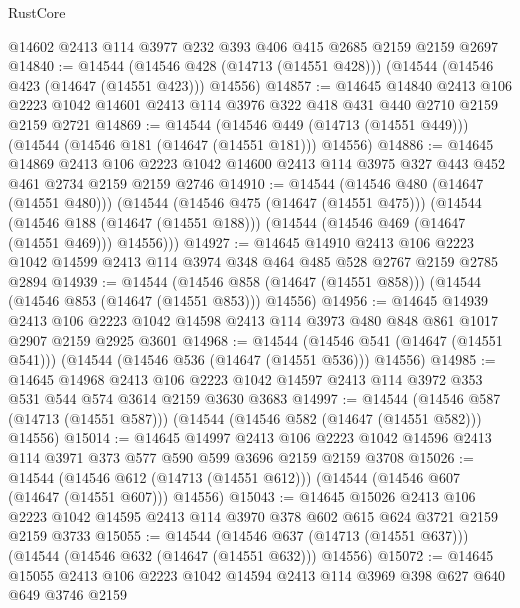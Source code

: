 \begin{lexlean}{RustCore}
\begin{coremodule}
    @14602
    @2413
    @114
    @3977
    @232
    @393
    @406
    @415
    @2685
    @2159
    @2159
    @2697
@14840 := @14544
    (@14546 @428 (@14713 (@14551 @428)))
    (@14544 (@14546 @423 (@14647 (@14551 @423))) @14556)
@14857 := @14645
    @14840
    @2413
    @106
    @2223
    @1042
    @14601
    @2413
    @114
    @3976
    @322
    @418
    @431
    @440
    @2710
    @2159
    @2159
    @2721
@14869 := @14544
    (@14546 @449 (@14713 (@14551 @449)))
    (@14544 (@14546 @181 (@14647 (@14551 @181))) @14556)
@14886 := @14645
    @14869
    @2413
    @106
    @2223
    @1042
    @14600
    @2413
    @114
    @3975
    @327
    @443
    @452
    @461
    @2734
    @2159
    @2159
    @2746
@14910 := @14544
    (@14546 @480 (@14647 (@14551 @480)))
    (@14544
      (@14546 @475 (@14647 (@14551 @475)))
      (@14544
        (@14546 @188 (@14647 (@14551 @188)))
        (@14544 (@14546 @469 (@14647 (@14551 @469))) @14556)))
@14927 := @14645
    @14910
    @2413
    @106
    @2223
    @1042
    @14599
    @2413
    @114
    @3974
    @348
    @464
    @485
    @528
    @2767
    @2159
    @2785
    @2894
@14939 := @14544
    (@14546 @858 (@14647 (@14551 @858)))
    (@14544 (@14546 @853 (@14647 (@14551 @853))) @14556)
@14956 := @14645
    @14939
    @2413
    @106
    @2223
    @1042
    @14598
    @2413
    @114
    @3973
    @480
    @848
    @861
    @1017
    @2907
    @2159
    @2925
    @3601
@14968 := @14544
    (@14546 @541 (@14647 (@14551 @541)))
    (@14544 (@14546 @536 (@14647 (@14551 @536))) @14556)
@14985 := @14645
    @14968
    @2413
    @106
    @2223
    @1042
    @14597
    @2413
    @114
    @3972
    @353
    @531
    @544
    @574
    @3614
    @2159
    @3630
    @3683
@14997 := @14544
    (@14546 @587 (@14713 (@14551 @587)))
    (@14544 (@14546 @582 (@14647 (@14551 @582))) @14556)
@15014 := @14645
    @14997
    @2413
    @106
    @2223
    @1042
    @14596
    @2413
    @114
    @3971
    @373
    @577
    @590
    @599
    @3696
    @2159
    @2159
    @3708
@15026 := @14544
    (@14546 @612 (@14713 (@14551 @612)))
    (@14544 (@14546 @607 (@14647 (@14551 @607))) @14556)
@15043 := @14645
    @15026
    @2413
    @106
    @2223
    @1042
    @14595
    @2413
    @114
    @3970
    @378
    @602
    @615
    @624
    @3721
    @2159
    @2159
    @3733
@15055 := @14544
    (@14546 @637 (@14713 (@14551 @637)))
    (@14544 (@14546 @632 (@14647 (@14551 @632))) @14556)
@15072 := @14645
    @15055
    @2413
    @106
    @2223
    @1042
    @14594
    @2413
    @114
    @3969
    @398
    @627
    @640
    @649
    @3746
    @2159

\end{coremodule}
\end{lexlean}
